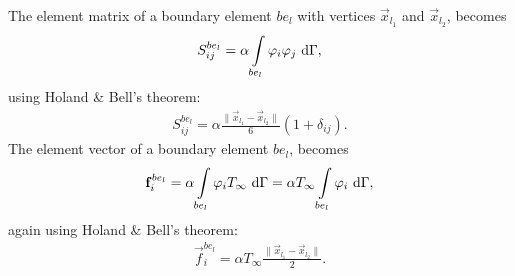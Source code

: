 The element matrix of a boundary element $be_l$ with vertices $\vec{x}_{l_1}$ and $\vec{x}_{l_2}$, becomes
\begin{gather*}
    S_{ij}^{be_l} = \alpha \int\displaylimits_{be_l}\varphi_i \varphi_j~\mathrm{d}\Gamma,
\end{gather*} using Holand \& Bell's theorem:
\begin{gather}
    S_{ij}^{be_l} = \alpha \frac{\lVert \vec{x}_{l_1} - \vec{x}_{l_2} \rVert}{6} \left( 1 + \delta_{ij} \right).
\end{gather}
The element vector of a boundary element $be_l$, becomes
\begin{gather*}
    \vec{f}_i^{be_l} = \alpha \int\displaylimits_{be_l}\varphi_i T_{\infty}~\mathrm{d}\Gamma = \alpha T_{\infty} \int\displaylimits_{be_l}\varphi_i~\mathrm{d}\Gamma,
\end{gather*} again using Holand \& Bell's theorem:
\begin{gather}
    \vec{f}_i^{be_l} = \alpha T_{\infty} \frac{\lVert \vec{x}_{l_1} - \vec{x}_{l_2} \rVert}{2}.
\end{gather}